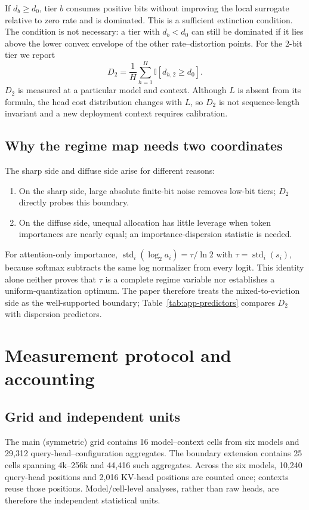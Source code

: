 If $d_b\ge d_0$, tier $b$ consumes positive bits without improving the local
surrogate relative to zero rate and is dominated.  This is a sufficient
extinction condition.  The condition is not necessary: a tier with $d_b<d_0$
can still be dominated if it lies above the lower convex envelope of the other
rate--distortion points.  For the 2-bit tier we report
\[
 D_2=\frac1H\sum_{h=1}^{H}\mathbb I[d_{h,2}\ge d_0].
\]
$D_2$ is measured at a particular model and context.  Although $L$ is absent
from its formula, the head cost distribution changes with $L$, so $D_2$ is not
sequence-length invariant and a new deployment context requires calibration.

\subsection{Why the regime map needs two coordinates}

The sharp side and diffuse side arise for different reasons:
\begin{enumerate}
 \item On the sharp side, large absolute finite-bit noise removes low-bit tiers;
 $D_2$ directly probes this boundary.
 \item On the diffuse side, unequal allocation has little leverage when token
 importances are nearly equal; an importance-dispersion statistic is needed.
\end{enumerate}
For attention-only importance,
$\operatorname{std}_i(\log_2 a_i)=\tau/\ln2$ with $\tau=\operatorname{std}_i(s_i)$,
because softmax subtracts the same log normalizer from every logit.  This
identity alone neither proves that $\tau$ is a complete regime variable nor
establishes a uniform-quantization optimum.  The paper therefore treats the
mixed-to-eviction side as the well-supported boundary;
Table~\ref{tab:app-predictors} compares $D_2$ with dispersion predictors.

\section{Measurement protocol and accounting}
\label{app:protocol}

\subsection{Grid and independent units}

The main (symmetric) grid contains 16 model--context cells from six models and
29,312 query-head--configuration aggregates.  The boundary extension contains
25 cells spanning 4k--256k and 44,416 such aggregates.  Across the six models,
10,240 query-head positions and 2,016 KV-head positions are counted once;
contexts reuse those positions.  Model/cell-level analyses, rather than raw
heads, are therefore the independent statistical units.

